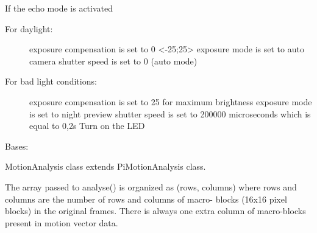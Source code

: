 \documentclass[letterpaper,10pt,english]{sphinxmanual}
\begin{document}
\begin{fulllineitems}
\begin{fulllineitems}
If the echo mode is activated
\begin{description}
\item[{For daylight:}] \leavevmode
exposure compensation is set to 0 \textless{}-25;25\textgreater{}
exposure mode is set to auto
camera shutter speed is set to 0 (auto mode)

\item[{For bad light conditions:}] \leavevmode
exposure compensation is set to 25 for maximum brightness
exposure mode is set to night preview
shutter speed is set to 200000 microseconds which is equal
to 0,2s
Turn on the LED

\end{description}

\end{fulllineitems}


\end{fulllineitems}


\begin{fulllineitems}
\label{rpicameramon:rpicameramon.motion.MotionAnalysis}
Bases: 

MotionAnalysis class extends PiMotionAnalysis class.

The array passed to analyse() is organized as (rows, columns)
where rows and columns are the number of rows and columns of macro-
blocks (16x16 pixel blocks) in the original frames. There is always
one extra column of macro-blocks present in motion vector data.

\begin{fulllineitems}
\label{rpicameramon:rpicameramon.motion.MotionAnalysis.analyse}
\end{fulllineitems}


\end{fulllineitems}

\end{document}
